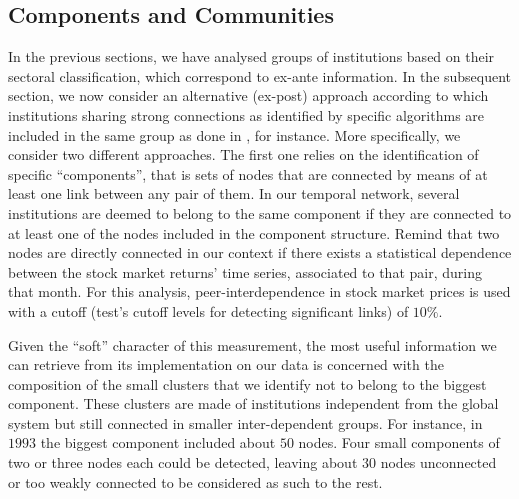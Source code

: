 \documentclass[a4paper,10pt]{article}
\begin{document}
\subsection{Components and Communities}
In the previous sections, we have analysed groups of institutions based on their sectoral classification, which correspond to 
ex-ante information. In the subsequent section, we now consider an alternative (ex-post) approach according to which 
institutions sharing strong connections as identified by specific algorithms are included in the same group as done in 
\cite{Zhou3,Song}, for instance. More specifically, we consider two different approaches. The first one relies on the identification of specific “components”, that is sets of 
nodes that are connected by means of at least one link between any pair of them. In our temporal network, several 
institutions are deemed to belong to the same component if they are connected to at least one of the nodes included in the 
component structure. Remind that two nodes are directly connected   in our context  if there exists a statistical dependence 
between the stock market returns’ time series, associated to that pair, during that month.  For this analysis, peer-interdependence 
in stock market prices is used with a cutoff (test’s cutoff levels for detecting significant links) of $10 \%$.

Given the “soft” character of this measurement, the most useful information we can retrieve from its implementation on our 
data is concerned with the composition of the small clusters that we identify not to belong to the biggest component. These 
clusters are made of institutions independent from the global system but still connected in smaller inter-dependent groups. 
For instance, in $1993$ the biggest component included about $50$ nodes. Four small components of two or three nodes each could 
be detected, leaving about $30$ nodes unconnected or too weakly connected to be considered as such to the rest.  
\end{document}
